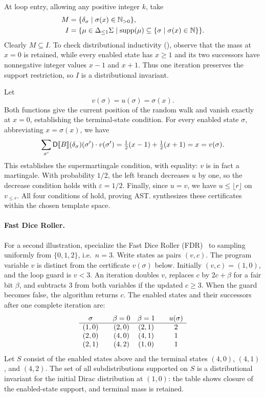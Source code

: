 At loop entry, allowing any positive integer $k$, take
\[
 \begin{aligned}
 M&=\{\delta_{\sigma}\mid\sigma(x)\in\mathbb N_{>0}\},\\
 I&=\{\mu\in{\Delta_{\leq 1}\Sigma}\mid
       \textnormal{supp}(\mu)\subseteq\{\sigma\mid\sigma(x)\in\mathbb N\}\}.
 \end{aligned}
\]
Clearly $M\subseteq I$. To check distributional inductivity
(), observe that the mass at $x=0$
is retained, while every enabled state has $x\geq1$ and its two
successors have nonnegative integer values $x-1$ and $x+1$.
Thus one iteration preserves the support restriction, so $I$ is a
distributional invariant.

Let
\[
 v(\sigma)=u(\sigma)=\sigma(x).
\]
Both functions give the current position of the random walk and vanish
exactly at $x=0$, establishing the terminal-state condition.
For every enabled state $\sigma$, abbreviating $x=\sigma(x)$, we have
\[
 \sum_{\sigma'}\mathsf{D}\llbracket B\rrbracket(\delta_{\sigma})(\sigma')\cdot v(\sigma')
 =\tfrac12(x-1)+\tfrac12(x+1)=x=v(\sigma).
\]
This establishes the supermartingale condition, with equality: $v$ is
in fact a martingale. With probability $1/2$, the left branch decreases
$u$ by one, so the decrease condition holds with $\varepsilon=1/2$.
Finally, since $u=v$, we have $u\leq\lfloor r\rfloor$ on $v_{\leq r}$.
All four conditions of  hold, proving AST.
 synthesizes these certificates within
the chosen template space.

\paragraph{Fast Dice Roller.}
For a second illustration, specialize the Fast Dice Roller
(FDR)~\cite{DBLP:journals/corr/abs-1304-1916} to sampling uniformly from
$\{0,1,2\}$, i.e.\ $n=3$.
Write states as pairs $(v,c)$.
The program variable $v$ is distinct from the certificate $v(\sigma)$ below.
Initially $(v,c)=(1,0)$, and the loop guard is $v<3$.
An iteration doubles $v$, replaces $c$ by $2c+\beta$ for a fair bit
$\beta$, and subtracts $3$ from both variables if the updated $c\geq3$.
When the guard becomes false, the algorithm returns $c$.
The enabled states and their successors after one complete iteration are:
\[
 \begin{array}{c@{\qquad}c@{\quad}c@{\qquad}c}
 \sigma & \beta=0 & \beta=1 & u(\sigma)\\ \hline
 (1,0) & (2,0) & (2,1) & 2\\
 (2,0) & (4,0) & (4,1) & 1\\
 (2,1) & (4,2) & (1,0) & 1
 \end{array}
\]
Let $S$ consist of the enabled states above and the terminal states
$(4,0)$, $(4,1)$, and $(4,2)$.
The set of all subdistributions supported on $S$ is a distributional
invariant for the initial Dirac distribution at $(1,0)$:
the table shows closure of the enabled-state support, and terminal
mass is retained.


